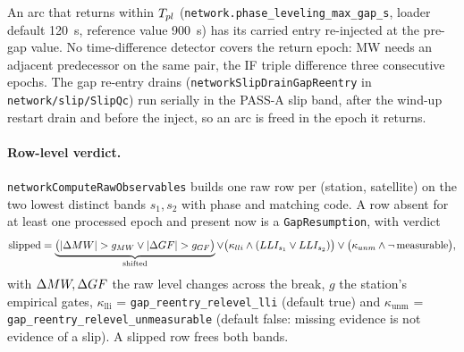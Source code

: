 \documentclass[main.tex]{subfiles}
\begin{document}
An arc that returns within $T_{pl}$
(\texttt{network.phase\_leveling\_max\_gap\_s}, loader default
\SI{120}{s}, reference value \SI{900}{s}) has its carried entry re-injected at
the pre-gap value. No time-difference detector covers the return epoch:
MW needs an adjacent predecessor on the same pair, the IF triple
difference three consecutive epochs. The gap re-entry drains
(\texttt{networkSlipDrainGapReentry} in \texttt{network/slip/SlipQc}) run
serially in the PASS-A slip band, after the wind-up restart drain and before
the inject, so an arc is freed in the epoch it returns.

\paragraph{Row-level verdict.}
\texttt{networkComputeRawObservables} builds one raw row per (station,
satellite) on the two lowest distinct bands $s_1, s_2$ with phase and
matching code. A row absent for at least one processed epoch and present
now is a \texttt{GapResumption}, with verdict
\begin{equation}
\text{slipped} = \underbrace{\big(|\Delta MW| > g_{MW} \vee |\Delta GF| > g_{GF}\big)}_{\text{shifted}}
\vee \big(\kappa_{lli} \wedge (LLI_{s_1} \vee LLI_{s_2})\big)
\vee \big(\kappa_{unm} \wedge \neg\,\text{measurable}\big),
\label{eq:wire-gap-verdict}
\end{equation}
with $\Delta MW, \Delta GF$ the raw level changes across the break,
$g$ the station's empirical gates, $\kappa_{\mathrm{lli}}$ =
\texttt{gap\_reentry\_relevel\_lli} (default true) and
$\kappa_{\mathrm{unm}}$ = \texttt{gap\_reentry\_relevel\_unmeasurable}
(default false: missing evidence is not evidence of a slip). A slipped
row frees both bands.
\end{document}

